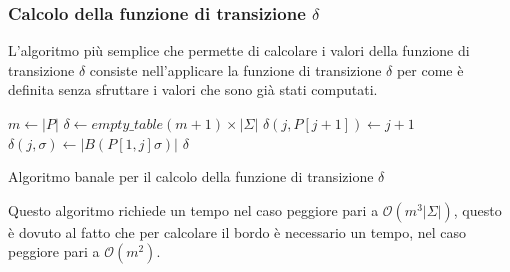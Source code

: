 \subsubsection{Calcolo della funzione di transizione $\delta$}
L'algoritmo più semplice che permette di calcolare i valori della funzione di
transizione $\delta$ consiste nell'applicare la funzione di transizione $\delta$
per come è definita senza sfruttare i valori che sono già stati computati.
\begin{algorithm}
    \begin{algorithmic}
        \State $m \gets |P|$
        \State $\delta \gets empty\_table (m + 1) \times | \Sigma|$
        \State $\delta(j, P[j + 1]) \gets j + 1$
        \EndFor
        \For{$\sigma \in \Sigma$}
        \State $\delta(j, \sigma) \gets |B(P[1, j]\sigma)|$
        \EndFor
        \EndFor
        \State \Return $\delta$
        \EndFunction
    \end{algorithmic}
    \caption{Algoritmo banale per il calcolo della funzione di transizione $\delta$}
\end{algorithm}
Questo algoritmo richiede un tempo nel caso peggiore pari a $\mathcal{O}(m^3
    |\Sigma|)$, questo è dovuto al fatto che per calcolare il bordo è necessario
un tempo, nel caso peggiore pari a $\mathcal{O}(m^2)$.

